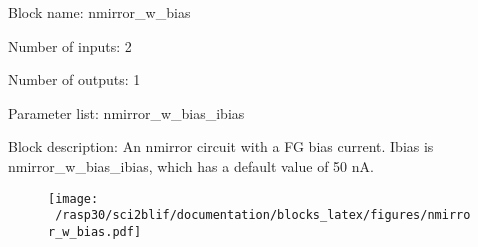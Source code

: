 \pagebreak

Block name: nmirror\_w\_bias

Number of inputs: 2

Number of outputs: 1

Parameter list: nmirror\_w\_bias\_ibias

Block description: 
An nmirror circuit with a FG bias current. Ibias is nmirror\_w\_bias\_ibias, which has a default value of 50 nA.

\begin{figure}[H]  %
\texttt{[image: ~/rasp30/sci2blif/documentation/blocks\_latex/figures/nmirror\_w\_bias.pdf]}
\end{figure}

